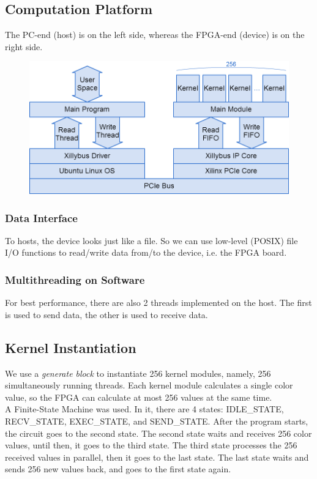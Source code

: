 \documentclass{acm_proc_article-sp}
\begin{document}
\subsection{Computation Platform}
The PC-end (host) is on the left side, whereas the FPGA-end (device) is on the right side.
\begin{figure}[H]
  \includegraphics[width=\linewidth,natwidth=865,natheight=442]{fpga_block.png}
  \label{fig:fpga_block}
\end{figure}
\subsubsection{Data Interface}
To hosts, the device looks just like a file. So we can use low-level (POSIX) file I/O functions to read/write data from/to the device, i.e. the FPGA board.
\subsubsection{Multithreading on Software}
For best performance, there are also 2 threads implemented on the host. The first is used to send data, the other is used to receive data.
\subsection{Kernel Instantiation}
We use a \textit{generate block} to instantiate 256 kernel modules, namely, 256 simultaneously running threads. Each kernel module calculates a single color value, so the FPGA can calculate at most 256 values at the same time. \\
A Finite-State Machine was used. In it, there are 4 states: IDLE\_STATE, RECV\_STATE, EXEC\_STATE, and SEND\_STATE. After the program starts, the circuit goes to the second state. The second state waits and receives 256 color values, until then, it goes to the third state. The third state processes the 256 received values in parallel, then it goes to the last state. The last state waits and sends 256 new values back, and goes to the first state again.
\end{document}
